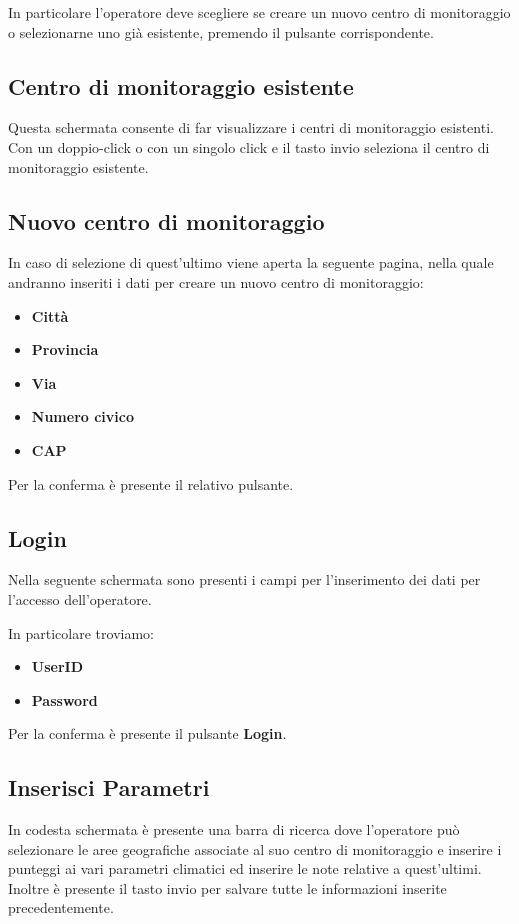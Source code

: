 In particolare l'operatore deve scegliere se creare un nuovo centro di monitoraggio o selezionarne uno già esistente, premendo il pulsante corrispondente.
\subsection{Centro di monitoraggio esistente}
Questa schermata consente di far visualizzare i centri di monitoraggio esistenti.
Con un doppio-click o con un singolo click e il tasto invio seleziona il centro di monitoraggio esistente.
\subsection{Nuovo centro di monitoraggio} \label{NuovoCentroDiMonitoraggio}
In caso di selezione di quest'ultimo viene aperta la seguente pagina, nella quale andranno inseriti i dati per creare un nuovo centro di monitoraggio:
\begin{itemize}
	\item \textbf{Città}
	\item \textbf{Provincia}
	\item \textbf{Via}
	\item \textbf{Numero civico}
	\item \textbf{CAP}
\end{itemize}
Per la conferma è presente il relativo pulsante.
\subsection{Login}
Nella seguente schermata sono presenti i campi per l'inserimento dei dati per l'accesso dell'operatore.

In particolare troviamo:
\begin{itemize}
	\item \textbf{UserID} 
	\item \textbf{Password}
\end{itemize} 

Per la conferma è presente il pulsante \textbf{Login}.
\subsection{Inserisci Parametri}
In codesta schermata è presente una barra di ricerca dove l'operatore può selezionare le aree geografiche associate al suo centro di monitoraggio e inserire i punteggi ai vari parametri climatici ed inserire le note relative a quest'ultimi.
Inoltre è presente il tasto invio per salvare tutte le informazioni inserite precedentemente.


